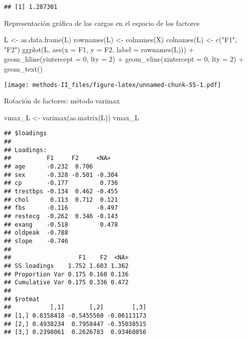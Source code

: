\documentclass[
]{article}
\newenvironment{Shaded}{\begin{snugshade}}{\end{snugshade}}
\newcommand{\AttributeTok}[1]{\textcolor[rgb]{0.77,0.63,0.00}{#1}}
\newcommand{\DecValTok}[1]{\textcolor[rgb]{0.00,0.00,0.81}{#1}}
\newcommand{\FunctionTok}[1]{\textcolor[rgb]{0.00,0.00,0.00}{#1}}
\newcommand{\NormalTok}[1]{#1}
\newcommand{\OtherTok}[1]{\textcolor[rgb]{0.56,0.35,0.01}{#1}}
\newcommand{\SpecialCharTok}[1]{\textcolor[rgb]{0.00,0.00,0.00}{#1}}
\newcommand{\StringTok}[1]{\textcolor[rgb]{0.31,0.60,0.02}{#1}}
\begin{document}
\begin{verbatim}
## [1] 1.287301
\end{verbatim}

Representación gráfica de las cargas en el espacio de los factores

\begin{Shaded}
\begin{Highlighting}[]
\NormalTok{L }\OtherTok{\textless{}{-}} \FunctionTok{as.data.frame}\NormalTok{(L)}
\FunctionTok{rownames}\NormalTok{(L) }\OtherTok{\textless{}{-}} \FunctionTok{colnames}\NormalTok{(X)}
\FunctionTok{colnames}\NormalTok{(L) }\OtherTok{\textless{}{-}} \FunctionTok{c}\NormalTok{(}\StringTok{"F1"}\NormalTok{, }\StringTok{"F2"}\NormalTok{)}
\FunctionTok{ggplot}\NormalTok{(L, }\FunctionTok{aes}\NormalTok{(}\AttributeTok{x =}\NormalTok{ F1, }\AttributeTok{y =}\NormalTok{ F2, }\AttributeTok{label =} \FunctionTok{rownames}\NormalTok{(L))) }\SpecialCharTok{+}
\FunctionTok{geom\_hline}\NormalTok{(}\AttributeTok{yintercept =} \DecValTok{0}\NormalTok{, }\AttributeTok{lty =} \DecValTok{2}\NormalTok{) }\SpecialCharTok{+}
\FunctionTok{geom\_vline}\NormalTok{(}\AttributeTok{xintercept =} \DecValTok{0}\NormalTok{, }\AttributeTok{lty =} \DecValTok{2}\NormalTok{) }\SpecialCharTok{+}
\FunctionTok{geom\_text}\NormalTok{()}
\end{Highlighting}
\end{Shaded}

\texttt{[image: methods-II\_files/figure-latex/unnamed-chunk-55-1.pdf]}

Rotación de factores: método varimax

\begin{Shaded}
\begin{Highlighting}[]
\NormalTok{vmax\_L }\OtherTok{\textless{}{-}} \FunctionTok{varimax}\NormalTok{(}\FunctionTok{as.matrix}\NormalTok{(L))}
\NormalTok{vmax\_L}
\end{Highlighting}
\end{Shaded}

\begin{verbatim}
## $loadings
## 
## Loadings:
##          F1     F2     <NA>  
## age      -0.232  0.706       
## sex      -0.328 -0.501 -0.304
## cp       -0.177         0.736
## trestbps -0.134  0.462 -0.455
## chol      0.113  0.712  0.121
## fbs      -0.116        -0.497
## restecg  -0.262  0.346 -0.143
## exang    -0.518         0.478
## oldpeak  -0.788              
## slope    -0.746              
## 
##                   F1    F2  <NA>
## SS loadings    1.752 1.603 1.362
## Proportion Var 0.175 0.160 0.136
## Cumulative Var 0.175 0.336 0.472
## 
## $rotmat
##           [,1]       [,2]        [,3]
## [1,] 0.8358418 -0.5455560 -0.06113173
## [2,] 0.4938234  0.7958447 -0.35038515
## [3,] 0.2398061  0.2626783  0.93460856
\end{verbatim}
\end{document}
